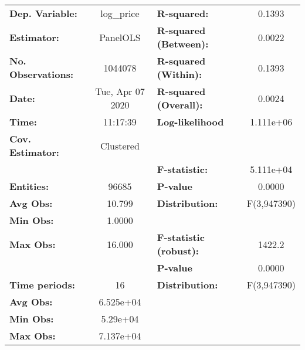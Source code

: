 \documentclass{report}
\begin{document}
\begin{center}
\begin{tabular}{lclc}
\toprule
\textbf{Dep. Variable:}        &     log\_price     & \textbf{  R-squared:         }   &      0.1393      \\
\textbf{Estimator:}            &      PanelOLS      & \textbf{  R-squared (Between):}  &      0.0022      \\
\textbf{No. Observations:}     &      1044078       & \textbf{  R-squared (Within):}   &      0.1393      \\
\textbf{Date:}                 &  Tue, Apr 07 2020  & \textbf{  R-squared (Overall):}  &      0.0024      \\
\textbf{Time:}                 &      11:17:39      & \textbf{  Log-likelihood     }   &    1.111e+06     \\
\textbf{Cov. Estimator:}       &     Clustered      & \textbf{                     }   &                  \\
\textbf{}                      &                    & \textbf{  F-statistic:       }   &    5.111e+04     \\
\textbf{Entities:}             &       96685        & \textbf{  P-value            }   &      0.0000      \\
\textbf{Avg Obs:}              &       10.799       & \textbf{  Distribution:      }   &   F(3,947390)    \\
\textbf{Min Obs:}              &       1.0000       & \textbf{                     }   &                  \\
\textbf{Max Obs:}              &       16.000       & \textbf{  F-statistic (robust):} &      1422.2      \\
\textbf{}                      &                    & \textbf{  P-value            }   &      0.0000      \\
\textbf{Time periods:}         &         16         & \textbf{  Distribution:      }   &   F(3,947390)    \\
\textbf{Avg Obs:}              &     6.525e+04      & \textbf{                     }   &                  \\
\textbf{Min Obs:}              &      5.29e+04      & \textbf{                     }   &                  \\
\textbf{Max Obs:}              &     7.137e+04      & \textbf{                     }   &                  \\
\bottomrule
\end{tabular}
\begin{tabular}{lcccccc}

\end{tabular}
\end{center}
\end{document}
